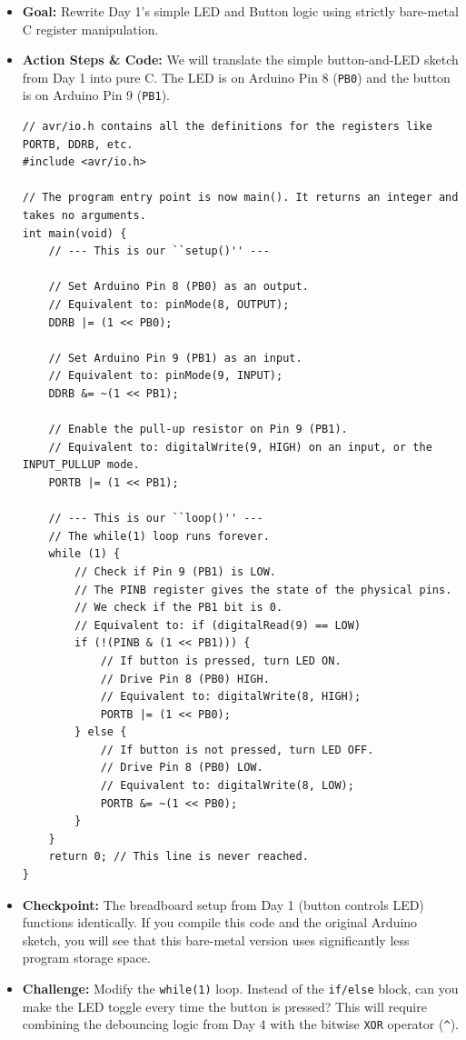 \documentclass[11pt,a4paper]{article}
\begin{document}
\begin{itemize}
    \item \textbf{Goal:} Rewrite Day 1's simple LED and Button logic using strictly bare-metal C register manipulation.
    \item \textbf{Action Steps \& Code:} We will translate the simple button-and-LED sketch from Day 1 into pure C. The LED is on Arduino Pin 8 (\verb|PB0|) and the button is on Arduino Pin 9 (\verb|PB1|).
\begin{lstlisting}[caption={Code for Module 5.3: Bare-Metal Blink}]
// avr/io.h contains all the definitions for the registers like PORTB, DDRB, etc.
#include <avr/io.h>

// The program entry point is now main(). It returns an integer and takes no arguments.
int main(void) {
    // --- This is our ``setup()'' ---

    // Set Arduino Pin 8 (PB0) as an output.
    // Equivalent to: pinMode(8, OUTPUT);
    DDRB |= (1 << PB0);

    // Set Arduino Pin 9 (PB1) as an input.
    // Equivalent to: pinMode(9, INPUT);
    DDRB &= ~(1 << PB1);

    // Enable the pull-up resistor on Pin 9 (PB1).
    // Equivalent to: digitalWrite(9, HIGH) on an input, or the INPUT_PULLUP mode.
    PORTB |= (1 << PB1);

    // --- This is our ``loop()'' ---
    // The while(1) loop runs forever.
    while (1) {
        // Check if Pin 9 (PB1) is LOW.
        // The PINB register gives the state of the physical pins.
        // We check if the PB1 bit is 0.
        // Equivalent to: if (digitalRead(9) == LOW)
        if (!(PINB & (1 << PB1))) {
            // If button is pressed, turn LED ON.
            // Drive Pin 8 (PB0) HIGH.
            // Equivalent to: digitalWrite(8, HIGH);
            PORTB |= (1 << PB0);
        } else {
            // If button is not pressed, turn LED OFF.
            // Drive Pin 8 (PB0) LOW.
            // Equivalent to: digitalWrite(8, LOW);
            PORTB &= ~(1 << PB0);
        }
    }
    return 0; // This line is never reached.
}
\end{lstlisting}
    \item \textbf{Checkpoint:} The breadboard setup from Day 1 (button controls LED) functions identically. If you compile this code and the original Arduino sketch, you will see that this bare-metal version uses significantly less program storage space.
    \item \textbf{Challenge:} Modify the \verb|while(1)| loop. Instead of the \verb|if/else| block, can you make the LED toggle every time the button is pressed? This will require combining the debouncing logic from Day 4 with the bitwise \verb|XOR| operator (\verb|^|).
\end{itemize}
\end{document}
